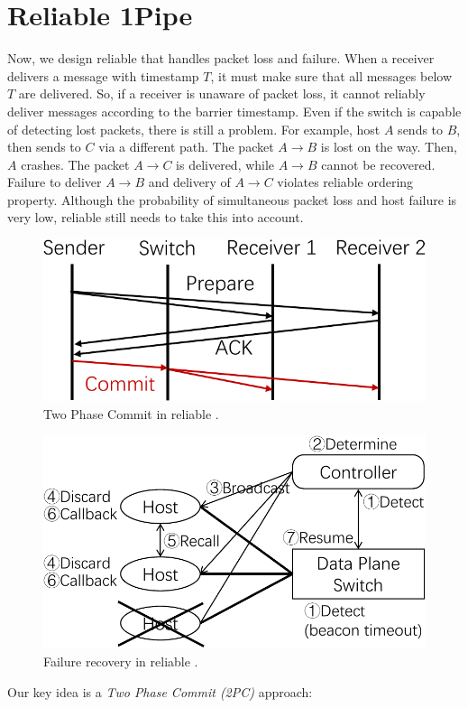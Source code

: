 \section{Reliable 1Pipe}
\label{sec:reliable}

Now, we design reliable \sys{} that handles packet loss and failure.
When a receiver delivers a message with timestamp $T$, it must make sure that all messages below $T$ are delivered.
So, if a receiver is unaware of packet loss, it cannot reliably deliver messages according to the barrier timestamp.
Even if the switch is capable of detecting lost packets, there is still a problem. %
For example, host $A$ sends to $B$, then sends to $C$ via a different path. The packet $A \rightarrow B$ is lost on the way. Then, $A$ crashes. The packet $A \rightarrow C$ is delivered, while $A \rightarrow B$ cannot be recovered. Failure to deliver $A \rightarrow B$ and delivery of $A \rightarrow C$ violates reliable ordering property.
Although the probability of simultaneous packet loss and host failure is very low, reliable \sys{} still needs to take this into account.


\begin{figure}[t]
\centering
	\includegraphics[width=.3\textwidth]{images/2PC.pdf}
	\caption{Two Phase Commit in reliable \sys{}.}
	\label{fig:2PC}
\end{figure}

\begin{figure}[t]
	\centering
	\includegraphics[width=.35\textwidth]{images/failure_recovery.pdf}
	\caption{Failure recovery in reliable \sys{}.}
	\label{fig:failure_recovery}
\end{figure}

Our key idea is a \emph{Two Phase Commit (2PC)} approach:

